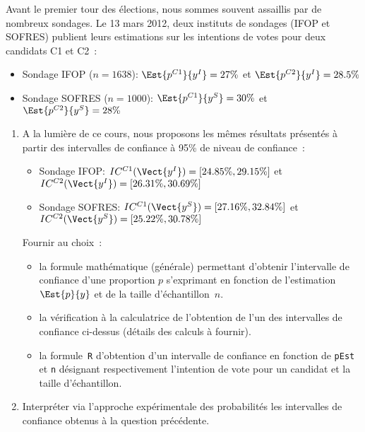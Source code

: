 \documentclass[]{article}
\begin{document}
\begin{exercice}

Avant le premier tour des élections, nous sommes souvent assaillis par de nombreux sondages. 
Le 13 mars 2012, deux instituts de sondages (IFOP et SOFRES) publient leurs estimations  sur les intentions de votes pour deux candidats C1 et C2~:



\begin{itemize}
\item Sondage IFOP ($n=1638$): $\Est{p^{C1}}{y^{I}}=27\%$ et $\Est{p^{C2}}{y^{I}}=28.5\%$
\item Sondage SOFRES ($n=1000$): $\Est{p^{C1}}{y^{S}}=30\%$ et $\Est{p^{C2}}{y^{S}}=28\%$
\end{itemize}

\begin{enumerate}
\item A la lumière de ce cours, nous proposons les mêmes résultats présentés à partir des intervalles de confiance à 95\% de niveau de confiance~: 

\begin{itemize}
\item Sondage IFOP: $IC^{C1}(\Vect{y^{I}})=[24.85\%,29.15\%]$ et  $IC^{C2}(\Vect{y^{I}})=[26.31\%,30.69\%]$
\item Sondage SOFRES:  $IC^{C1}(\Vect{y^{S}})=[27.16\%,32.84\%]$ et  $IC^{C2}(\Vect{y^{S}})=[25.22\%,30.78\%]$
\end{itemize}

 Fournir au choix~:
 \begin{itemize}
 \item la formule mathématique (générale) permettant d'obtenir l'intervalle de confiance d'une proportion $p$ s'exprimant en fonction de l'estimation $\Est{p}{y}$ et de la taille d'échantillon~$n$.
 \item la vérification à la calculatrice de l'obtention de l'un des intervalles de confiance ci-dessus (détails des calculs à fournir).
 \item la formule~\texttt{R} d'obtention d'un intervalle de confiance en fonction de \texttt{pEst} et \texttt{n} désignant respectivement l'intention de vote pour un candidat et la taille d'échantillon.
 \end{itemize}




\item Interpréter via l'approche expérimentale des probabilités les intervalles de confiance obtenus à la question précédente.




\end{enumerate}
\end{exercice}
\end{document}

